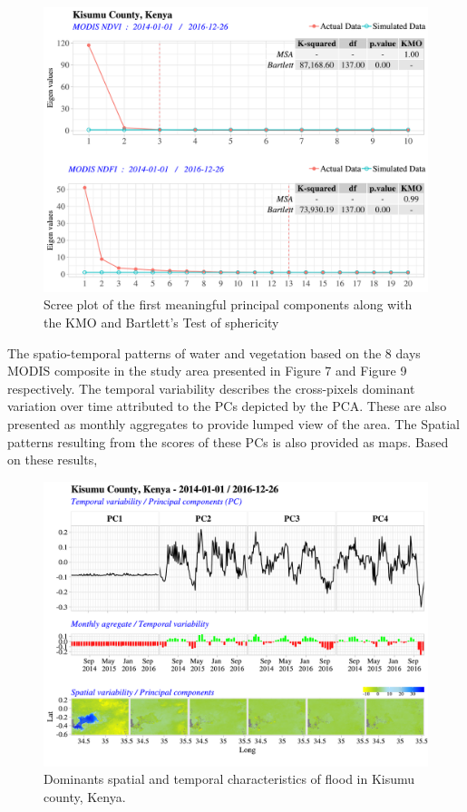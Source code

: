 \documentclass[12pt,oneside]{article}
\begin{document}
\begin{figure}
\includegraphics[width=1\linewidth]{figures/Mapping_FBFS_NDVI_NDFI_parallel_analysis_sreeplot} \caption{Scree plot of the first meaningful principal components along with the KMO and Bartlett's Test of sphericity}\label{fig:fig6}
\end{figure}

The spatio-temporal patterns of water and vegetation based on the 8 days MODIS composite in the study area presented in Figure 7 and Figure 9 respectively. The temporal variability describes the cross-pixels dominant variation over time attributed to the PCs depicted by the PCA. These are also presented as monthly aggregates to provide lumped view of the area. The Spatial patterns resulting from the scores of these PCs is also provided as maps. Based on these results,

\begin{figure}
\includegraphics[width=1\linewidth]{figures/Mapping_FBFS_NDFI_PCA_plot_Kisumu} \caption{Dominants spatial and temporal characteristics of flood in Kisumu county, Kenya.}\label{fig:fig7}
\end{figure}
\end{document}
